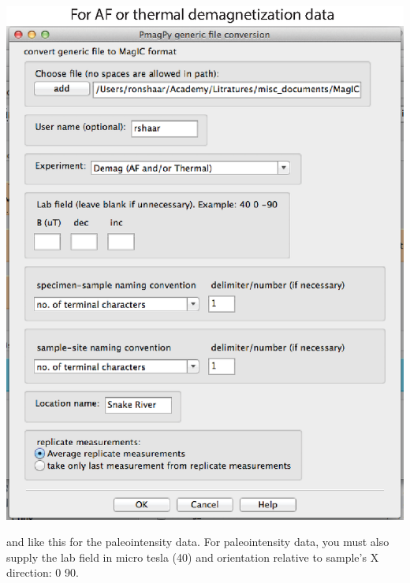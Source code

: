 \documentclass[11pt]{book}
\begin{document}
{\begin{itemize}
\includegraphics[width=15cm]{EPSfiles/FigConvertGenericA.eps}

and like this for the  paleointensity data.  For paleointensity data, you must also supply the lab field in micro tesla (40) and orientation relative to sample's X direction:  0 90.


\end{itemize}}
\end{document}
